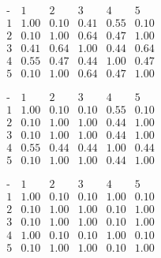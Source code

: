\documentclass[12pt,english]{article}
\begin{document}
\begin{equation*}
\begin{array}{c|ccccc}
\mbox{-}& 1 & 2 & 3 & 4 & 5\\
\hline
1 & 1.00 & 0.10 & 0.41 & 0.55 & 0.10 \\
2 & 0.10 & 1.00 & 0.64 & 0.47 & 1.00 \\
3 & 0.41 & 0.64 & 1.00 & 0.44 & 0.64 \\
4 & 0.55 & 0.47 & 0.44 & 1.00 & 0.47 \\
5 & 0.10 & 1.00 & 0.64 & 0.47 & 1.00 
\end{array}
\end{equation*}

\begin{equation*}
\begin{array}{c|ccccc}
\mbox{-}& 1 & 2 & 3 & 4 & 5\\
\hline
1 & 1.00 & 0.10 & 0.10 & 0.55 & 0.10 \\
2 & 0.10 & 1.00 & 1.00 & 0.44 & 1.00 \\
3 & 0.10 & 1.00 & 1.00 & 0.44 & 1.00 \\
4 & 0.55 & 0.44 & 0.44 & 1.00 & 0.44 \\
5 & 0.10 & 1.00 & 1.00 & 0.44 & 1.00 
\end{array}
\end{equation*}

\begin{equation*}
\begin{array}{c|ccccc}
\mbox{-}& 1 & 2 & 3 & 4 & 5\\
\hline
1 & 1.00 & 0.10 & 0.10 & 1.00 & 0.10 \\
2 & 0.10 & 1.00 & 1.00 & 0.10 & 1.00 \\
3 & 0.10 & 1.00 & 1.00 & 0.10 & 1.00 \\
4 & 1.00 & 0.10 & 0.10 & 1.00 & 0.10 \\
5 & 0.10 & 1.00 & 1.00 & 0.10 & 1.00 
\end{array}
\end{equation*}
\end{document}
